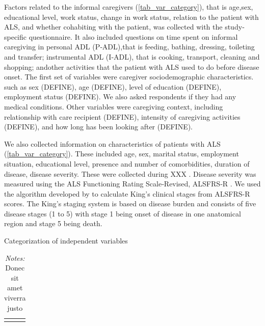 \documentclass[12pt]{article}
\begin{document}
Factors related to the informal caregivers (\autoref{tab_var_category}), that is age,sex, educational level, work status, change in work status, relation to the patient with ALS, and whether cohabiting with the patient, was collected with the study‐specific questionnaire. It also included questions on time spent on informal caregiving in personal ADL (P‐ADL),that is feeding, bathing, dressing, toileting and transfer; instrumental ADL (I‐ADL), that is cooking, transport, cleaning and shopping; andother activities that the patient with ALS used to do before disease onset. The first set of variables were caregiver sociodemographic characteristics.  such as sex (DEFINE), age (DEFINE), level of education (DEFINE), employment status (DEFINE). We also asked respondents if they had any medical conditions. Other variables were caregiving context, including relationship with care recipient (DEFINE), intensity of caregiving activities (DEFINE), and how long has been looking after (DEFINE).

We also collected information on characteristics of patients with ALS (\autoref{tab_var_category}). These included age, sex, marital status, employment situation, educational level, presence and number of comorbidities, duration of disease, disease severity. These were collected during XXX \parencite{gould_acceptance_2024}. Disease severity was measured using the ALS Functioning Rating Scale‐Revised, ALSFRS‐R \parencite{cedarbaum_alsfrs-r_1999}. We used the algorithm developed by \textcite{balendra_estimating_2014} to calculate King's clinical stages from ALSFRS-R scores. The King's staging system is based on disease burden and consists of five disease stages (1 to 5) with stage 1 being onset of disease in one anatomical region and stage 5 being death.

\begin{table}[H]
    \centering \singlespacing \small
    \caption{Categorization of independent variables}
    \begin{tabular}{|L{6cm}|L{9cm}|}
        \hline
    \end{tabular}
    \label{tab_var_category}
    \caption*{\footnotesize \textit{Notes:} Donec sit amet viverra justo}
\end{table}
\end{document}
